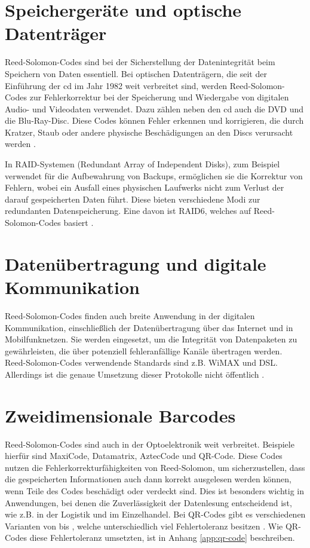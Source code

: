 \section{Speichergeräte und optische Datenträger}

Reed-Solomon-Codes sind bei der Sicherstellung der Datenintegrität beim Speichern von Daten essentiell. 
Bei optischen Datenträgern, die seit der Einführung der \acrfull{cd} im Jahr 1982 weit verbreitet sind, werden Reed-Solomon-Codes zur Fehlerkorrektur bei der Speicherung und Wiedergabe von digitalen Audio- und Videodaten verwendet. Dazu zählen neben den \acrshort{cd} auch die DVD und die Blu-Ray-Disc. 
Diese Codes können Fehler erkennen und korrigieren, die durch Kratzer, Staub oder andere physische Beschädigungen an den Discs verursacht werden \cite{changReedSolomonProductCodeRSPC1998}. 

In RAID-Systemen (Redundant Array of Independent Disks), zum Beispiel verwendet für die Aufbewahrung von Backups, ermöglichen sie die Korrektur von Fehlern, wobei ein Ausfall eines physischen Laufwerks nicht zum Verlust der darauf gespeicherten Daten führt.
Diese bieten verschiedene Modi zur redundanten Datenspeicherung.
Eine davon ist RAID6, welches auf Reed-Solomon-Codes basiert \cite{RAIDStorageTechnology2021}.

\section{Datenübertragung und digitale Kommunikation}

Reed-Solomon-Codes finden auch breite Anwendung in der digitalen Kommunikation, einschließlich der Datenübertragung über das Internet und in Mobilfunknetzen. 
Sie werden eingesetzt, um die Integrität von Datenpaketen zu gewährleisten, die über potenziell fehleranfällige Kanäle übertragen werden. 
Reed-Solomon-Codes verwendende Standards sind z.B. WiMAX und DSL.
Allerdings ist die genaue Umsetzung dieser Protokolle nicht öffentlich \cite{vermillionEndtoEndDSLArchitectures}.

\section{Zweidimensionale Barcodes}

Reed-Solomon-Codes sind auch in der Optoelektronik weit verbreitet. Beispiele hierfür sind MaxiCode, Datamatrix, AztecCode und QR-Code. 
Diese Codes nutzen die Fehlerkorrekturfähigkeiten von Reed-Solomon, um sicherzustellen, dass die gespeicherten Informationen auch dann korrekt ausgelesen werden können, wenn Teile des Codes beschädigt oder verdeckt sind. 
Dies ist besonders wichtig in Anwendungen, bei denen die Zuverlässigkeit der Datenlesung entscheidend ist, wie z.B. in der Logistik und im Einzelhandel.
Bei QR-Codes gibt es verschiedenen Varianten von  bis , welche unterschiedlich viel Fehlertoleranz besitzen \cite{QRCode2024}.
Wie QR-Codes diese Fehlertoleranz umsetzten, ist in Anhang \ref{app:qr-code} beschreiben.